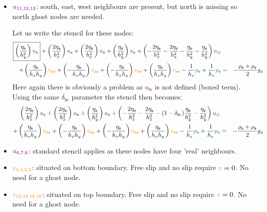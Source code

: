 \begin{itemize}
\item ${\color{violet} u_{\tt 11,12,13}}$: south, east, west neighbours are present, but north is missing so north ghost nodes are needed.

Let us write the stencil for these nodes:
\begin{eqnarray}
\boxed{\left( \frac{\eta_{\tt n}}{h_y^2} \right) {\color{violet} u_{\tt n}}} + 
\left( \frac{2\eta_{\tt e}}{h_x^2} \right) {\color{violet} u_{\tt e}} + 
\left( \frac{2\eta_{\tt w}}{h_x^2} \right) {\color{violet} u_{\tt w}} + 
\left( \frac{\eta_{\tt s}}{h_y^2} \right) {\color{violet} u_{\tt s}} + 
\left( -\frac{2\eta_{\tt e}}{h_x^2} -\frac{2\eta_{\tt w}}{h_x^2}  
-\frac{\eta_{\tt n}}{h_y^2} -\frac{\eta_{\tt s}}{h_y^2}  
\right) {\color{violet} u_\otimes} \nonumber\\
+
\left( \frac{\eta_{\tt n}}{h_x h_y} \right) {\color{orange} v_{\tt ne}}+ 
\left(-\frac{\eta_{\tt n}}{h_x h_y} \right) {\color{orange} v_{\tt nw}}+ 
\left(-\frac{\eta_{\tt s}}{h_x h_y} \right) {\color{orange} v_{\tt se}}+ 
\left( \frac{\eta_{\tt s}}{h_x h_y} \right) {\color{orange} v_{\tt sw}} 
- \frac{1}{h_x} {\color{teal}p_{\tt e}} + \frac{1}{h_x} {\color{teal}p_{\tt w}} 
&=& -\frac{\rho_{\tt n}+\rho_{\tt s}}{2} g_x \nonumber
\end{eqnarray}
Here again there is obviously a problem as ${\color{violet} u_{\tt n}}$ is not defined (boxed term).
Using the same $\delta_{bc}$ parameter the stencil then becomes:
\begin{eqnarray}
\left( \frac{2\eta_{\tt e}}{h_x^2} \right) {\color{violet} u_{\tt e}} + 
\left( \frac{2\eta_{\tt w}}{h_x^2} \right) {\color{violet} u_{\tt w}} + 
\left( \frac{\eta_{\tt s}}{h_y^2} \right) {\color{violet} u_{\tt s}} + 
\left( -\frac{2\eta_{\tt e}}{h_x^2} -\frac{2\eta_{\tt w}}{h_x^2}  
-(1-\delta_{bc})\frac{\eta_{\tt n}}{h_y^2} -\frac{\eta_{\tt s}}{h_y^2}  
\right) {\color{violet} u_\otimes} \nonumber\\
+
\left( \frac{\eta_{\tt n}}{h_x h_y} \right) {\color{orange} v_{\tt ne}}+ 
\left(-\frac{\eta_{\tt n}}{h_x h_y} \right) {\color{orange} v_{\tt nw}}+ 
\left(-\frac{\eta_{\tt s}}{h_x h_y} \right) {\color{orange} v_{\tt se}}+ 
\left( \frac{\eta_{\tt s}}{h_x h_y} \right) {\color{orange} v_{\tt sw}} 
- \frac{1}{h_x} {\color{teal}p_{\tt e}} + \frac{1}{h_x} {\color{teal}p_{\tt w}} 
&=& -\frac{\rho_{\tt n}+\rho_{\tt s}}{2} g_x \nonumber
\end{eqnarray}



\item ${\color{violet} u_{\tt 6,7,8}}$: standard stencil applies as these nodes have four 'real' neighbours.
\item ${\color{orange} v_{\tt 0,1,2,3}}$: situated on bottom boundary. Free slip and no slip require ${\color{orange} v}=0$. No need for a ghost node.
\item ${\color{orange} v_{\tt 12,13,14,15}}$: situated on top boundary. Free slip and no slip require ${\color{orange} v}=0$. No need for a ghost node.


\end{itemize}
